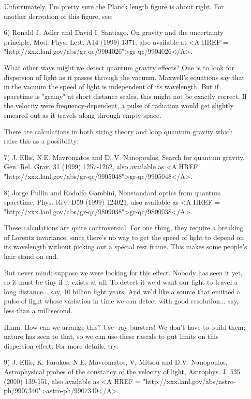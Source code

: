 Unfortunately, I'm pretty sure the Planck length figure is about
right.  For another derivation of this figure, see: 

6) Ronald J. Adler and David I. Santiago, On gravity and the uncertainty
principle, Mod. Phys. Lett. A14 (1999) 1371, also available at
<A HREF = "http://xxx.lanl.gov/abs/gr-qc/9904026">gr-qc/9904026</A>.    
  
What other ways might we detect quantum gravity effects?  One is to
look for dispersion of light as it passes through the vacuum.
Maxwell's equations say that in the vacuum the speed of light is
independent of its wavelength.  But if spacetime is "grainy" at short
distance scales, this might not be exactly correct.  If the velocity
were frequency-dependent, a pulse of radiation would get slightly
smeared out as it travels along through empty space.

There are calculations in both string theory and loop quantum gravity
which raise this as a possibility: 

7) J. Ellis, N.E. Mavromatos and D. V. Nanopoulos,
Search for quantum gravity, Gen. Rel. Grav. 31 (1999) 1257-1262,
also available as <A HREF = "http://xxx.lanl.gov/abs/gr-qc/9905048">gr-qc/9905048</A>.

8) Jorge Pullin and Rodolfo Gambini, Nonstandard optics from quantum
spacetime, Phys. Rev. D59 (1999) 124021, also available as <A HREF = "http://xxx.lanl.gov/abs/gr-qc/9809038">gr-qc/9809038</A>. 
  
These calculations are quite controversial.  For one thing, they
require a breaking of Lorentz invariance, since there's no way to get
the speed of light to depend on its wavelength without picking out a
special rest frame.  This makes some people's hair stand on end.

But never mind: suppose we were looking for this effect.  Nobody has
seen it yet, so it must be tiny if it exists at all.  To detect it
we'd want our light to travel a long distance... say, 10 billion light
years.  And we'd like a source that emitted a pulse of light whose
variation in time we can detect with good resolution... say, less than
a millisecond.

Hmm.  How can we arrange this?  Use \gamma -ray bursters!  We don't have
to build them; nature has seen to that, so we can use these rascals to
put limits on this dispersion effect.  For more details, try:

9) J. Ellis, K. Farakos, N.E. Mavromatos, V. Mitsou and D.V. Nanopoulos,
Astrophysical probes of the constancy of the velocity of light,
Astrophys. J. 535 (2000) 139-151, also available as <A HREF = "http://xxx.lanl.gov/abs/astro-ph/9907340">astro-ph/9907340</A>.  

